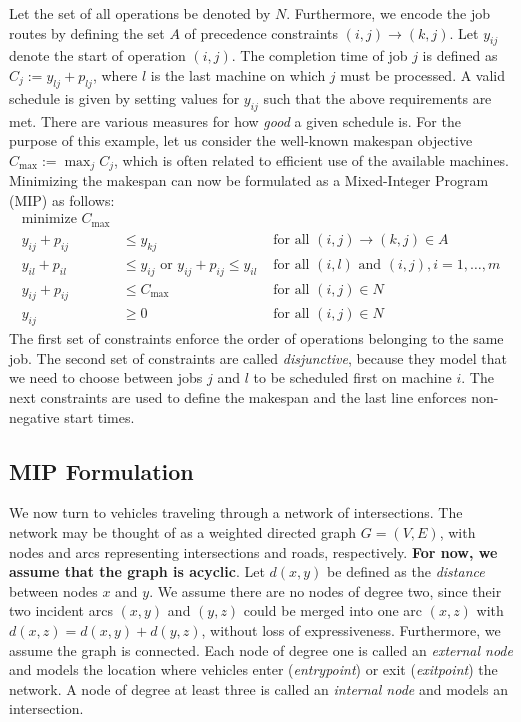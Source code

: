 \documentclass{article}
\theoremstyle{definition}
\begin{document}
Let the set of all operations be denoted by $N$. Furthermore, we encode the job
routes by defining the set $A$ of precedence constraints
$(i,j) \xrightarrow{} (k,j)$. Let $y_{ij}$ denote the start of operation
$(i,j)$. The completion time of job $j$ is defined as
$C_{j} := y_{lj} + p_{lj}$, where $l$ is the last machine on which $j$ must be
processed. A valid schedule is given by setting values for $y_{ij}$ such that
the above requirements are met. There are various measures for how \textit{good}
a given schedule is. For the purpose of this example, let us consider the
well-known makespan objective $C_{\text{max}} := \max_{j} C_{j}$, which is often
related to efficient use of the available machines. Minimizing the makespan can
now be formulated as a Mixed-Integer Program (MIP) as follows:
%
\begin{align*}
  \text{minimize } C_{\text{max}} \\
  y_{ij} + p_{ij} &\leq y_{kj}  & \text{ for all } (i,j) \xrightarrow{} (k,j) \in A \\
  y_{il} + p_{il} &\leq  y_{ij} \text{ or } y_{ij} + p_{ij} \leq y_{il}  & \text{ for all } (i,l) \text{ and } (i,j), i =1, \dots,m \\
  y_{ij} + p_{ij} &\leq C_{\text{max}} & \text{ for all } (i,j) \in N \\
  y_{ij} &\geq 0 & \text{ for all } (i,j) \in N
\end{align*}
%
The first set of constraints enforce the order of operations belonging to the
same job. The second set of constraints are called \textit{disjunctive}, because
they model that we need to choose between jobs $j$ and $l$ to be scheduled first
on machine $i$. The next constraints are used to define the makespan and the
last line enforces non-negative start times.


\subsection{MIP Formulation}
We now turn to vehicles traveling through a network of intersections. The
network may be thought of as a weighted directed graph $G=(V,E)$, with nodes and
arcs representing intersections and roads, respectively. \textbf{For now, we
  assume that the graph is acyclic}. Let $d(x,y)$ be defined as the
\textit{distance} between nodes $x$ and $y$. We assume there are no nodes of
degree two, since their two incident arcs $(x,y)$ and $(y,z)$ could be merged
into one arc $(x,z)$ with $d(x,z) = d(x,y) + d(y,z)$, without loss of
expressiveness. Furthermore, we assume the graph is connected. Each node of
degree one is called an \textit{external node} and models the location where
vehicles enter (\textit{entrypoint}) or exit (\textit{exitpoint}) the network. A
node of degree at least three is called an \textit{internal node} and models an
intersection.
\end{document}
